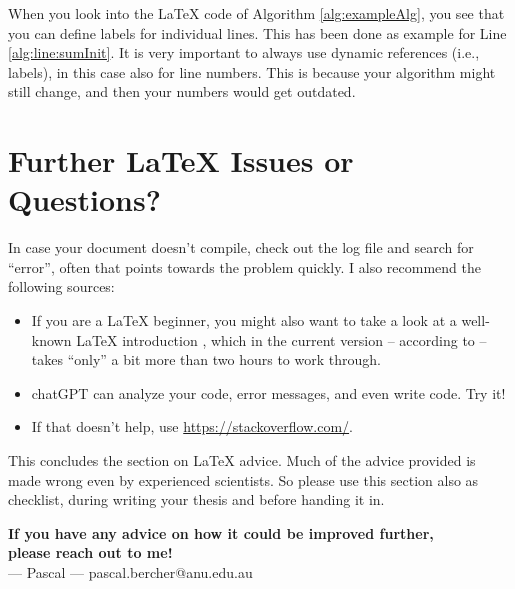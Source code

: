 When you look into the \LaTeX{} code of Algorithm \ref{alg:exampleAlg}, you see that you can define labels for individual lines. This has been done as example for Line \ref{alg:line:sumInit}. It is very important to always use dynamic references (i.e., labels), in this case also for line numbers. This is because your algorithm might still change, and then your numbers would get outdated.



\section{Further \LaTeX{} Issues or Questions?}

In case your document doesn't compile, check out the log file and search for ``error'', often that points towards the problem quickly. I also recommend the following sources:
\begin{itemize}
  \item If you are a \LaTeX{} beginner, you might also want to take a look at a well-known \LaTeX{} introduction \citep{Oetiker2021LatexIntroduction}, which in the current version -- according to \citeauthor{Oetiker2021LatexIntroduction} -- takes ``only'' a bit more than two hours to work through.
  \item chatGPT can analyze your code, error messages, and even write code. Try it!
  \item If that doesn't help, use \url{https://stackoverflow.com/}. 
\end{itemize}




\vfill
This concludes the section on \LaTeX{} advice. Much of the advice provided is made wrong even by experienced scientists. So please use this section also as checklist, during writing your thesis and before handing it in.

\textbf{If you have any advice on how it could be improved further,\\
please reach out to me!}\\[.5em]
--- Pascal --- \hfill pascal.bercher@anu.edu.au